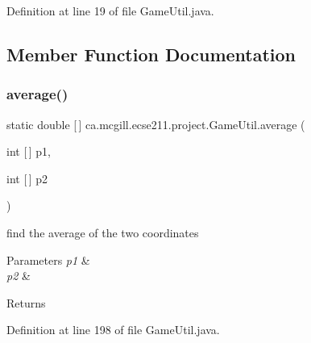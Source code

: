Definition at line 19 of file Game\+Util.\+java.



\subsection{Member Function Documentation}
\mbox{\label{classca_1_1mcgill_1_1ecse211_1_1project_1_1_game_util_ae5c5c445ab84516991219ca3783fcaa4}} 
\subsubsection{\texorpdfstring{average()}{average()}}
{\footnotesize\ttfamily static double \mbox{[}$\,$\mbox{]} ca.\+mcgill.\+ecse211.\+project.\+Game\+Util.\+average (\begin{DoxyParamCaption}\item[{int \mbox{[}$\,$\mbox{]}}]{p1,  }\item[{int \mbox{[}$\,$\mbox{]}}]{p2 }\end{DoxyParamCaption})\hspace{0.3cm}{\ttfamily [static]}}

find the average of the two coordinates


\begin{DoxyParams}{Parameters}
{\em p1} & \\
\hline
{\em p2} & \\
\hline
\end{DoxyParams}
\begin{DoxyReturn}{Returns}

\end{DoxyReturn}


Definition at line 198 of file Game\+Util.\+java.


